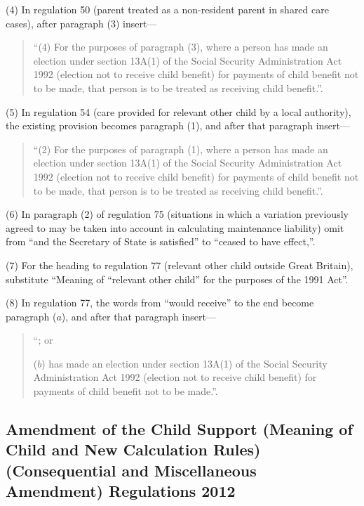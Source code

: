 \documentclass[12pt,a4paper]{article}
\begin{document}
(4) In regulation 50 (parent treated as a non-resident parent in shared care cases), after paragraph (3) insert—
\begin{quotation}
“(4) For the purposes of paragraph (3), where a person has made an election under section 13A(1) of the Social Security Administration Act 1992 (election not to receive child benefit) for payments of child benefit not to be made, that person is to be treated as receiving child benefit.”.
\end{quotation}

(5) In regulation 54 (care provided for relevant other child by a local authority), the existing provision becomes paragraph (1), and after that paragraph insert—
\begin{quotation}
“(2) For the purposes of paragraph (1), where a person has made an election under section 13A(1) of the Social Security Administration Act 1992 (election not to receive child benefit) for payments of child benefit not to be made, that person is to be treated as receiving child benefit.”.
\end{quotation}

(6) In paragraph (2) of regulation 75 (situations in which a variation previously agreed to may be taken into account in calculating maintenance liability) omit from “and the Secretary of State is satisfied” to “ceased to have effect,”.

(7) For the heading to regulation 77 (relevant other child outside Great Britain), substitute “Meaning of “relevant other child” for the purposes of the 1991 Act”.

(8) In regulation 77, the words from “would receive” to the end become paragraph ($a$), and after that paragraph insert—
\begin{quotation}
“; or

($b$) has made an election under section 13A(1) of the Social Security Administration Act 1992 (election not to receive child benefit) for payments of child benefit not to be made.”.
\end{quotation}

\subsection[9. Amendment of the Child Support (Meaning of Child and New Calculation Rules) (Consequential and Miscellaneous Amendment) Regulations 2012]{Amendment of the Child Support (Meaning of Child and New Calculation Rules) (Consequential and Miscellaneous Amendment) Regulations 2012}
\end{document}

